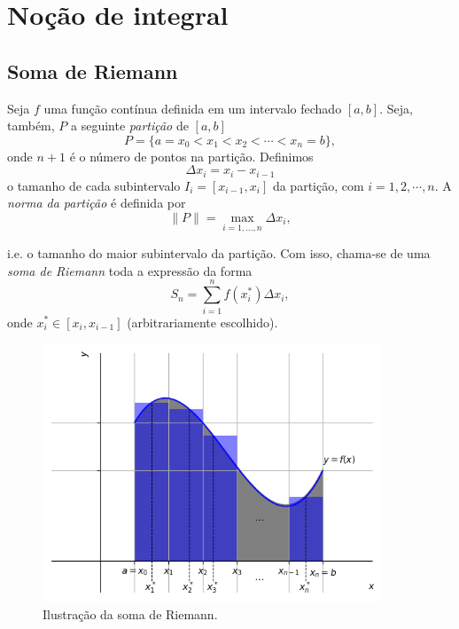 \cleardoublepage\documentclass[../main.tex]{subfiles}
\begin{document}
\section{Noção de integral}\label{cap_int_sec_nocaoint}

\subsection{Soma de Riemann}\label{subsec:SomaRiemann}

Seja $f$ uma função contínua definida em um intervalo fechado $[a, b]$. Seja, também, $P$ a seguinte \emph{partição} de $[a, b]$
\begin{equation}
  P = \{a=x_0<x_1<x_2<\cdots<x_n=b\},
\end{equation}
onde $n+1$ é o número de pontos na partição. Definimos
\begin{equation}
  \Delta x_i = x_{i} - x_{i-1}
\end{equation}
o tamanho de cada subintervalo $I_{i} = [x_{i-1}, x_{i}]$ da partição, com $i = 1, 2, \cdots, n$. A \emph{norma da partição} é definida por
\begin{equation}
  \|P\| = \max_{i=1, \dotsc, n} \Delta x_i,
\end{equation}
 
i.e. o tamanho do maior subintervalo da partição. Com isso, chama-se de uma \emph{soma de Riemann} toda a expressão da forma
\begin{equation}
  S_n = \sum_{i=1}^n f(x_i^*)\Delta x_i,
\end{equation}
onde $x_i^*\in [x_i, x_{i-1}]$ (arbitrariamente escolhido).

\begin{figure}[H]
  \centering
  \includegraphics[width=0.9\textwidth]{figs/fig_soma_de_Riemann}
  \caption{Ilustração da soma de Riemann.}
  \label{fig:soma_de_Riemann}
\end{figure}
\end{document}
